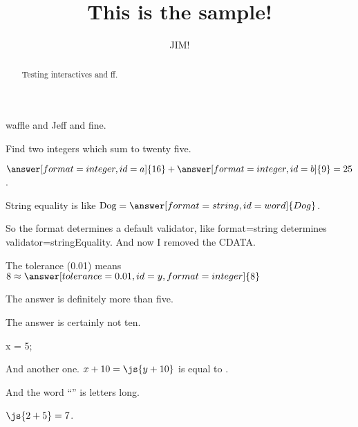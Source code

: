 \documentclass{ximera}
\title{This is the sample!}
\author{JIM!}
\begin{document}
\begin{abstract}
Testing interactives and ff.
\end{abstract}
\maketitle

waffle and Jeff and fine.


\begin{problem}
  Find two integers which sum to twenty five.

  \begin{validator}[a+b==25]
    $\answer[format=integer,id=a]{16} + \answer[format=integer,id=b]{9} = 25$.
  \end{validator}
\end{problem}

\begin{problem}
  String equality is like $\mbox{Dog} = \answer[format=string,id=word]{Dog}$.

  So the format determines a default validator, like format=string determines validator=stringEquality.  And now I removed the CDATA.
\end{problem}

\begin{problem}
  The tolerance (0.01) means $8 \approx \answer[tolerance=0.01,id=y,format=integer]{8}$
  
  \begin{feedback}
    The answer is definitely more than five.
  \end{feedback}

  \begin{feedback}  [$10$]
    The answer is certainly not ten.
  \end{feedback}
\end{problem}

\begin{javascript}
x = 5;
\end{javascript}

And another one.  $x + 10 = \js{y+10}$ is equal to .

And the word ``'' is  letters long.

$\js{2+5} = 7$.
\end{document}

